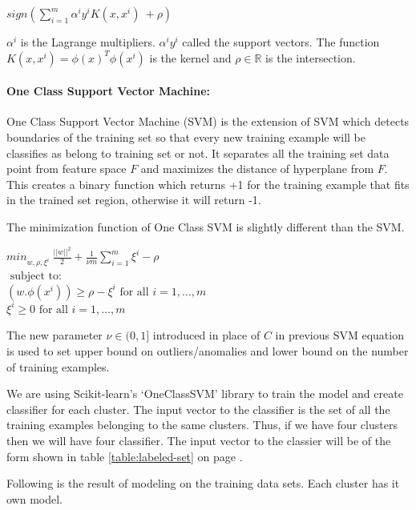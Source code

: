 \documentclass[12pt,oneside,a4paper]{article}
\begin{document}
\begin{center}
$sign(\sum_{i=1}^m \alpha^i y^i K(x,x^i) \ + \rho)$
\end{center}

$\alpha^i$ is the Lagrange multipliers. $\alpha^i y^i$ called the support vectors. The function $K(x,x^i)=\phi(x)^T \phi(x^i)$ is the kernel and $\rho \in \mathbb{R}$ is the intersection.

\paragraph{One Class Support Vector Machine:}

One Class Support Vector Machine (SVM) is the extension of SVM which detects boundaries of the training set so that every new training example will be classifies as belong to training set or not. It separates all the training set data point from feature space $F$ and maximizes the distance of hyperplane from $F$. This creates a binary function which returns +1 for the training example that fits in the trained set region, otherwise it will return -1.

The minimization function of One Class SVM is slightly different than the SVM. \cite{svm}

\begin{center}
  ${min}_{w,\rho,\xi^i} \ \frac{||w||^2}{2} + \frac{1}{\nu m} \sum_{i=1}^m \xi^i - \rho$ \\
  $\mbox{ subject to: }$ \\
  $(w.\phi(x^i)) \geq \rho - \xi^i \mbox{ for all } i = 1, \dots, m$ \\
  \hspace{2cm} $\xi^i \geq 0 \mbox{ for all } i = 1, \dots, m$ \\
\end{center}

The new parameter $\nu \in (0,1]$ introduced in place of $C$ in previous SVM equation is used to set upper bound on outliers/anomalies and lower bound on the number of training examples.

We are using Scikit-learn's `OneClassSVM' library to train the model and create classifier for each cluster. The input vector to the classifier is the set of all the training examples belonging to the same clusters. Thus, if we have four clusters then we will have four classifier. The input vector to the classier will be of the form shown in table \ref{table:labeled-set} on page \pageref{table:labeled-set}.

Following is the result of modeling on the training data sets. Each cluster has it own model.
\end{document}
